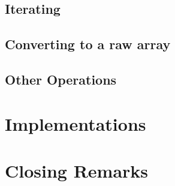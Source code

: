 \documentclass{article}
\begin{document}
	
	
	
	
	
	
	
	
	\subsection{Iterating}
	\label{subsec:Iterating}
	
	
	
	
	
	
	
	
	
	\subsection{Converting to a raw array}
	\label{subsec:ConvertRawArray}
	
	

	
	
	
	
	
	
	\subsection{Other Operations}
	
	
	
	\section{Implementations}
	\label{sec:Implementations}
	
	
	
	\section{Closing Remarks}
	
	
	
	\newpage
	
	
\end{document}
